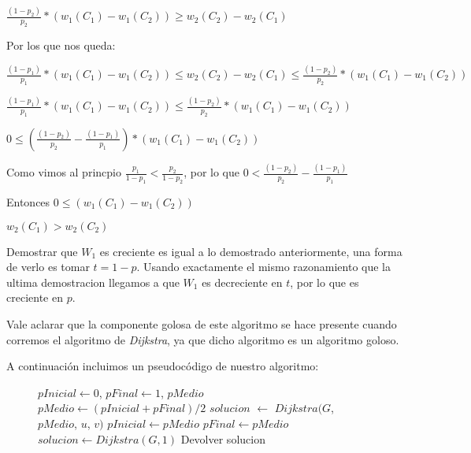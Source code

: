 $\frac{(1-p_2)}{p_2}*(w_1(C_1) - w_1(C_2)) \geq  w_2(C_2) - w_2(C_1) $

Por los que nos queda:

$\frac{(1-p_1)}{p_1}*(w_1(C_1) - w_1(C_2)) \leq  w_2(C_2) - w_2(C_1) \leq \frac{(1-p_2)}{p_2}*(w_1(C_1) - w_1(C_2))$

$\frac{(1-p_1)}{p_1}*(w_1(C_1) - w_1(C_2)) \leq \frac{(1-p_2)}{p_2}*(w_1(C_1) - w_1(C_2))$

$ 0 \leq (\frac{(1-p_2)}{p_2} - \frac{(1-p_1)}{p_1})*(w_1(C_1) - w_1(C_2))$

Como vimos al princpio $\frac{p_1}{1-p_1} < \frac{p_2}{1-p_2}$, por lo que $0 < \frac{(1-p_2)}{p_2} - \frac{(1-p_1)}{p_1} $

Entonces $ 0 \leq (w_1(C_1) - w_1(C_2))$

$w_2(C_1) > w_2(C_2)$

Demostrar que $W_1$ es creciente es igual a lo demostrado anteriormente, una forma de verlo es tomar $t= 1-p$. Usando exactamente el mismo razonamiento que la ultima demostracion llegamos a que $W_1$ es decreciente en $t$, por lo que es creciente en $p$.


Vale aclarar que la componente golosa de este algoritmo se hace presente cuando corremos el algoritmo de \emph{Dijkstra}, ya que dicho algoritmo es un algoritmo goloso.

A continuación incluimos un pseudocódigo de nuestro algoritmo:

\begin{center}
 \begin{figure}[H]
  \begin{pseudo}
    \State $pInicial \leftarrow 0$, $pFinal \leftarrow 1$, $pMedio$
      \State $pMedio \leftarrow (pInicial + pFinal)/2$
      \State $solucion$ $\leftarrow$ $Dijkstra(G$, $pMedio$, $u$, $v)$
	 \State $pInicial \leftarrow pMedio$
      \Else
	 \State $pFinal \leftarrow pMedio$
      \EndIf
    \EndFor
      \State $solucion \leftarrow Dijkstra(G, 1)$
    \EndIf
    \State Devolver solucion
   \EndProcedure
  \end{pseudo}
 \end{figure}
\end{center}